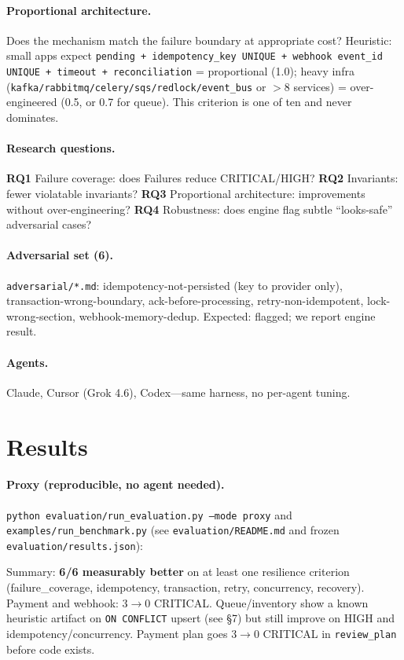 \documentclass[conference]{IEEEtran}
\begin{document}
\paragraph{Proportional architecture.} Does the mechanism match the failure boundary at appropriate cost? Heuristic: small apps expect \texttt{pending + idempotency\_key UNIQUE + webhook event\_id UNIQUE + timeout + reconciliation} = proportional (1.0); heavy infra (\texttt{kafka/rabbitmq/celery/sqs/redlock/event\_bus} or $>$8 services) = over-engineered (0.5, or 0.7 for queue). This criterion is one of ten and never dominates.

\paragraph{Research questions.}
\textbf{RQ1} Failure coverage: does Failures reduce CRITICAL/HIGH?
\textbf{RQ2} Invariants: fewer violatable invariants?
\textbf{RQ3} Proportional architecture: improvements without over-engineering?
\textbf{RQ4} Robustness: does engine flag subtle ``looks-safe'' adversarial cases?

\paragraph{Adversarial set (6).} \texttt{adversarial/*.md}: idempotency-not-persisted (key to provider only), transaction-wrong-boundary, ack-before-processing, retry-non-idempotent, lock-wrong-section, webhook-memory-dedup. Expected: flagged; we report engine result.

\paragraph{Agents.} Claude, Cursor (Grok 4.6), Codex---same harness, no per-agent tuning.
\section{Results}

\paragraph{Proxy (reproducible, no agent needed).} \texttt{python evaluation/run\_evaluation.py --mode proxy} and \texttt{examples/run\_benchmark.py} (see \texttt{evaluation/README.md} and frozen \texttt{evaluation/results.json}):



Summary: \textbf{6/6 measurably better} on at least one resilience criterion (failure\_coverage, idempotency, transaction, retry, concurrency, recovery). Payment and webhook: 3$\to$0 CRITICAL. Queue/inventory show a known heuristic artifact on \texttt{ON CONFLICT} upsert (see \S7) but still improve on HIGH and idempotency/concurrency. Payment plan goes 3$\to$0 CRITICAL in \texttt{review\_plan} before code exists.
\end{document}
